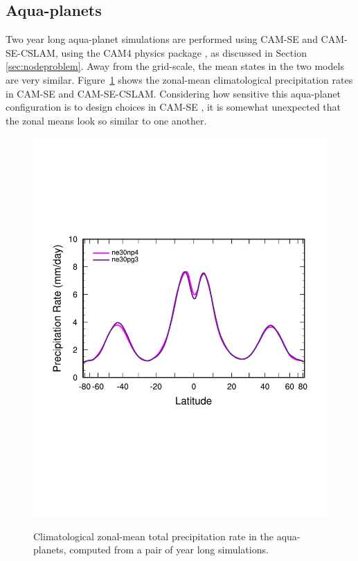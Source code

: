 \documentclass[twocol]{ametsoc}
\begin{document}
\subsection{{\color{red}Aqua-planets{}}}

{\color{red}Two year long aqua-planet simulations are performed using CAM-SE and CAM-SE-CSLAM, using the CAM4 physics package \citep{CAM4}, as discussed in Section \ref{sec:nodeproblem}. Away from the grid-scale, the mean states in the two models are very similar. Figure~\ref{fig:zonal} shows the zonal-mean climatological precipitation rates in CAM-SE and CAM-SE-CSLAM. Considering how sensitive this aqua-planet configuration is to design choices in CAM-SE \citep{LetAl2018JAMES}, it is somewhat unexpected that the zonal means look so similar to one another.{}} 

\begin{figure}[t]
\begin{center}
\noindent\includegraphics[width=37pc,angle=0]{figs/temp_dzonal.pdf}\\
\end{center}
\caption{Climatological zonal-mean total precipitation rate in the aqua-planets, computed from a pair of year long simulations.}
\label{fig:zonal}
\end{figure}
\end{document}
